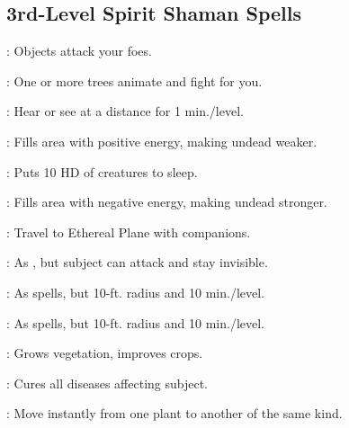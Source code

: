 \begin{multicols}{2}
\subsection{3rd-Level Spirit Shaman Spells}
\begin{description*}
\item[\linkspell{Animate Objects}:] Objects attack your foes.
\item[\linkspell{Animate Plants}:] One or more trees animate and fight for you.
\item[\linkspell{Clairvoyance}:] Hear or see at a distance for 1 min./level.
\item[\linkspell{Consecrate}:] Fills area with positive energy, making undead weaker.
\item[\linkspell{Deep Slumber}:] Puts 10 HD of creatures to sleep. 
\item[\linkspell{Desecrate}:] Fills area with negative energy, making undead stronger.
\item[\linkspell{Etherealness}:] Travel to Ethereal Plane with companions.
\item[\linkspell{Invisibility, Greater}:] As , but subject can attack and stay invisible.
\item[\linkspell{Magic Circle Against Chaos}:] As  spells, but 10-ft. radius and 10 min./level.
\item[\linkspell{Magic Circle Against Law}:] As  spells, but 10-ft. radius and 10 min./level. 
\item[\linkspell{Plant Growth}:] Grows vegetation, improves crops.
\item[\linkspell{Remove Disease}:] Cures all diseases affecting subject.
\item[\linkspell{Transport via Plants}:] Move instantly from one plant to another of the same kind. 
\end{description*}


\end{multicols}
